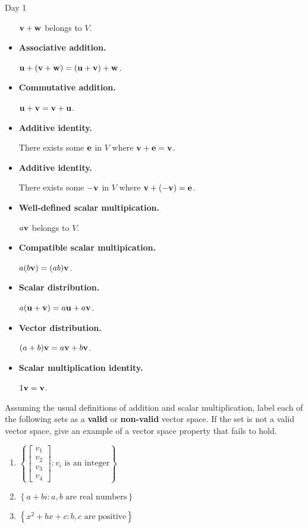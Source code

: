 \begin{applicationActivities}{Day 1}
\begin{definition}
\begin{multicols}{2}
\begin{itemize}
          \(\mathbf v+\mathbf w\) belongs to \(V\).
    \item \textbf{Associative addition.}

          \(\mathbf u+(\mathbf v+\mathbf w)=
          (\mathbf u+\mathbf v)+\mathbf w\).
    \item \textbf{Commutative addition.}

          \(\mathbf u+\mathbf v=
          \mathbf v+\mathbf u\).
    \item \textbf{Additive identity.}

          There exists some \(\mathbf e\) in \(V\)
          where \(\mathbf v+\mathbf e=\mathbf v\).
    \item \textbf{Additive identity.}

          There exists some \(-\mathbf v\) in \(V\)
          where \(\mathbf v+(-\mathbf v)=\mathbf e\).
    \item \textbf{Well-defined scalar multipication.}

          \(a\mathbf v\) belongs to
          \(V\).
    \item \textbf{Compatible scalar multipication.}

          \(a(b\mathbf v)=(ab)\mathbf v\).
    \item \textbf{Scalar distribution.}

          \(a(\mathbf u+\mathbf v)=a\mathbf u+a\mathbf v\).
    \item \textbf{Vector distribution.}

          \((a+b)\mathbf v=a\mathbf v+b\mathbf v\).
    \item \textbf{Scalar multiplication identity.}

          \(1\mathbf v=\mathbf v\).
  \end{itemize}
  \end{multicols}
\end{definition}

\begin{activity}{15}
  Assuming the usual definitions of addition and scalar multiplication,
  label each of the following sets as a \textbf{valid} or \textbf{non-valid}
  vector space. If the set is not a valid vector space, give an example of
  a vector space property that fails to hold.
  \begin{multicols}{2}
  \begin{enumerate}
    \item \(\left\{
    \begin{bmatrix}
      v_1\\v_2\\v_3\\v_4
    \end{bmatrix}:v_i\text{ is an integer}\right\}\)
    \item \(\left\{
      a+bi
      :a,b\text{ are real numbers}\right\}\)
    \item \(\left\{
      x^2+bx+c
      :b,c\text{ are positive}\right\}\)
  \end{enumerate}
  \end{multicols}
\end{activity}



\end{applicationActivities}
